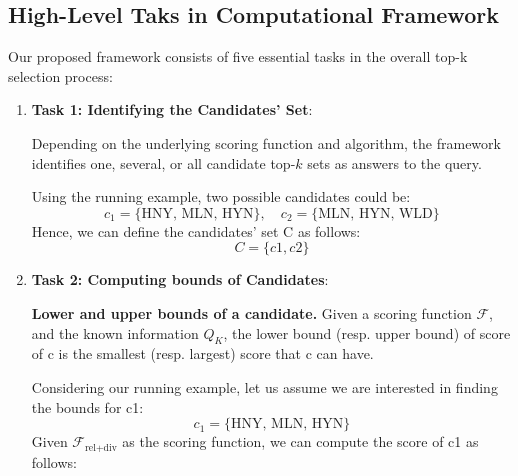 
\subsection{High-Level Taks in Computational Framework}\label{sec:section2.3}
Our proposed framework consists of five essential tasks in the overall top-k selection process:

\begin{enumerate}
    \item \textbf{Task 1: Identifying the Candidates' Set}: 


    Depending on the underlying scoring function and algorithm, the framework identifies one, several, or all candidate top-$k$ sets as answers to the query.
    
    \begin{example}
        Using the running example, two possible candidates could be: 
        \[
        c_1 = \{\text{HNY, MLN, HYN}\}, \quad c_2 = \{\text{MLN, HYN, WLD}\}
        \]
        Hence, we can define the candidates' set C as follows:
        \[
        C = \{c1, c2\}
        \]
        
    \end{example}
    
    \item \textbf{Task 2: Computing bounds of Candidates}: 
         \begin{definition}
     {\bf Lower and upper bounds of a candidate.} Given a scoring function $\mathcal{F}$, and the known information $Q_K$, the lower bound (resp. upper bound) of score of c is the smallest (resp. largest) score that c can have.
    \end{definition}

    \begin{example}
        Considering our running example, let us assume we are interested in finding the bounds for c1:
        \[
        c_1 = \{\text{HNY, MLN, HYN}\}
        \]
        Given $\mathcal{F}_{\text{rel+div}}$ as the scoring function, we can compute the score of c1 as follows:
        

\end{example}
\end{enumerate}
